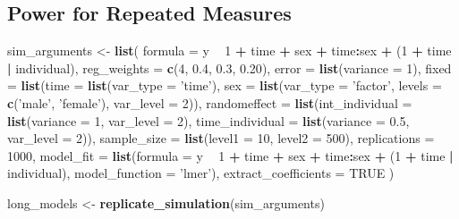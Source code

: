 \documentclass[man]{apa6}
\newenvironment{Shaded}{\begin{snugshade}}{\end{snugshade}}
\newcommand{\DataTypeTok}[1]{\textcolor[rgb]{0.13,0.29,0.53}{#1}}
\newcommand{\DecValTok}[1]{\textcolor[rgb]{0.00,0.00,0.81}{#1}}
\newcommand{\FloatTok}[1]{\textcolor[rgb]{0.00,0.00,0.81}{#1}}
\newcommand{\KeywordTok}[1]{\textcolor[rgb]{0.13,0.29,0.53}{\textbf{#1}}}
\newcommand{\NormalTok}[1]{#1}
\newcommand{\OperatorTok}[1]{\textcolor[rgb]{0.81,0.36,0.00}{\textbf{#1}}}
\newcommand{\OtherTok}[1]{\textcolor[rgb]{0.56,0.35,0.01}{#1}}
\newcommand{\StringTok}[1]{\textcolor[rgb]{0.31,0.60,0.02}{#1}}
\begin{document}
\hypertarget{power-for-repeated-measures}{%
\subsection{Power for Repeated Measures}\label{power-for-repeated-measures}}

\begin{Shaded}
\begin{Highlighting}[]
\NormalTok{sim_arguments <-}\StringTok{ }\KeywordTok{list}\NormalTok{(}
  \DataTypeTok{formula =}\NormalTok{ y }\OperatorTok{~}\StringTok{ }\DecValTok{1} \OperatorTok{+}\StringTok{ }\NormalTok{time }\OperatorTok{+}\StringTok{ }\NormalTok{sex }\OperatorTok{+}\StringTok{ }\NormalTok{time}\OperatorTok{:}\NormalTok{sex }\OperatorTok{+}\StringTok{ }\NormalTok{(}\DecValTok{1} \OperatorTok{+}\StringTok{ }\NormalTok{time }\OperatorTok{|}\StringTok{ }\NormalTok{individual),}
  \DataTypeTok{reg_weights =} \KeywordTok{c}\NormalTok{(}\DecValTok{4}\NormalTok{, }\FloatTok{0.4}\NormalTok{, }\FloatTok{0.3}\NormalTok{, }\FloatTok{0.20}\NormalTok{),}
  \DataTypeTok{error =} \KeywordTok{list}\NormalTok{(}\DataTypeTok{variance =} \DecValTok{1}\NormalTok{),}
  \DataTypeTok{fixed =} \KeywordTok{list}\NormalTok{(}\DataTypeTok{time =} \KeywordTok{list}\NormalTok{(}\DataTypeTok{var_type =} \StringTok{'time'}\NormalTok{),}
               \DataTypeTok{sex =} \KeywordTok{list}\NormalTok{(}\DataTypeTok{var_type =} \StringTok{'factor'}\NormalTok{, }\DataTypeTok{levels =} \KeywordTok{c}\NormalTok{(}\StringTok{'male'}\NormalTok{, }\StringTok{'female'}\NormalTok{),}
                          \DataTypeTok{var_level =} \DecValTok{2}\NormalTok{)),}
  \DataTypeTok{randomeffect =} \KeywordTok{list}\NormalTok{(}\DataTypeTok{int_individual =} \KeywordTok{list}\NormalTok{(}\DataTypeTok{variance =} \DecValTok{1}\NormalTok{, }\DataTypeTok{var_level =} \DecValTok{2}\NormalTok{),}
                      \DataTypeTok{time_individual =} \KeywordTok{list}\NormalTok{(}\DataTypeTok{variance =} \FloatTok{0.5}\NormalTok{, }\DataTypeTok{var_level =} \DecValTok{2}\NormalTok{)),}
  \DataTypeTok{sample_size =} \KeywordTok{list}\NormalTok{(}\DataTypeTok{level1 =} \DecValTok{10}\NormalTok{, }\DataTypeTok{level2 =} \DecValTok{500}\NormalTok{),}
  \DataTypeTok{replications =} \DecValTok{1000}\NormalTok{,}
  \DataTypeTok{model_fit =} \KeywordTok{list}\NormalTok{(}\DataTypeTok{formula =}\NormalTok{ y }\OperatorTok{~}\StringTok{ }\DecValTok{1} \OperatorTok{+}\StringTok{ }\NormalTok{time }\OperatorTok{+}\StringTok{ }\NormalTok{sex }\OperatorTok{+}\StringTok{ }\NormalTok{time}\OperatorTok{:}\NormalTok{sex }\OperatorTok{+}\StringTok{ }
\StringTok{                     }\NormalTok{(}\DecValTok{1} \OperatorTok{+}\StringTok{ }\NormalTok{time }\OperatorTok{|}\StringTok{ }\NormalTok{individual), }
                   \DataTypeTok{model_function =} \StringTok{'lmer'}\NormalTok{),}
  \DataTypeTok{extract_coefficients =} \OtherTok{TRUE}
\NormalTok{)}

\NormalTok{long_models <-}\StringTok{ }\KeywordTok{replicate_simulation}\NormalTok{(sim_arguments)}
\end{Highlighting}
\end{Shaded}
\end{document}
